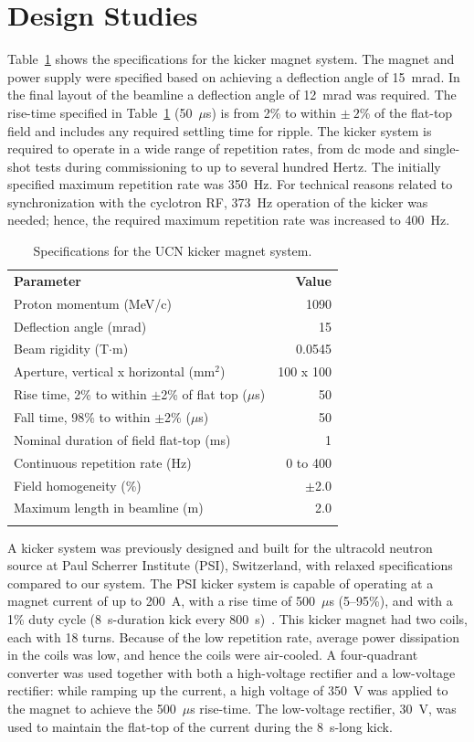 \documentclass[aps,prab,twocolumn,superscriptaddress]{revtex4-1}
\begin{document}
\section{Design Studies} 

Table~\ref{tab:specifcations} shows the specifications for the kicker magnet system. 
The magnet and power supply were specified based on achieving a deflection angle of 15~mrad.  In the final layout of the beamline a deflection angle of 12~mrad was required. The rise-time specified in Table~\ref{tab:specifcations} (50~$\mu$s) is from 2\% to within $\pm~2$\% of the flat-top field and includes any required settling time for ripple. The kicker system is required to operate in a wide range of repetition rates, from dc mode and single-shot tests during commissioning to up to several hundred Hertz. The initially specified maximum repetition rate was 350~Hz.  For technical reasons related to synchronization with the cyclotron RF, 373~Hz operation of the kicker was needed; hence, the required maximum repetition rate was increased to 400~Hz.

\begin{table}[h!] 
\centering
\caption{Specifications for the UCN kicker magnet system.}
\begin{tabular}{lr}
	\toprule 
\textbf{Parameter} & \textbf{Value} \\ 
	\colrule 
Proton momentum (MeV/c)  & 1090 \\ 
Deflection angle (mrad) & 15 \\ 
Beam rigidity (T$\cdot$m) & 0.0545 \\ 
Aperture, vertical x horizontal (mm$^2$) & 100 x 100  \\ 
Rise time, 2\% to within $\pm$2\% of flat top ($\mu$s) & 50\\ 
Fall time, 98\% to within $\pm$2\% ($\mu$s) & 50\\ 
Nominal duration of field flat-top (ms) & 1 \\ 
Continuous repetition rate (Hz) & 0 to 400 \\
Field homogeneity (\%) & $\pm$2.0 \\ 
Maximum length in beamline (m) & 2.0 \\
	\botrule
\end{tabular} 
\label{tab:specifcations}
\end{table}


A kicker system was previously designed and built for the ultracold neutron source at Paul Scherrer Institute (PSI), Switzerland, with relaxed specifications compared to our system.  The PSI kicker system is capable of operating at a magnet current of up to 200~A, with a rise time of 500~$\mu$s (5--95\%), and with a 1\% duty cycle (8~s-duration kick every 800~s)~\cite{PSI:Anicic2005}. This kicker magnet had two coils, each with 18 turns. Because of the low repetition rate, average power dissipation in the coils was low, and hence the coils were air-cooled. A four-quadrant converter was used together with both a high-voltage rectifier and a low-voltage rectifier: while ramping up the current, a high voltage of  350~V was applied to the magnet to achieve the 500~$\mu$s rise-time. The low-voltage rectifier, 30~V, was used to maintain the flat-top of the current during the 8~s-long kick. 
\end{document}
